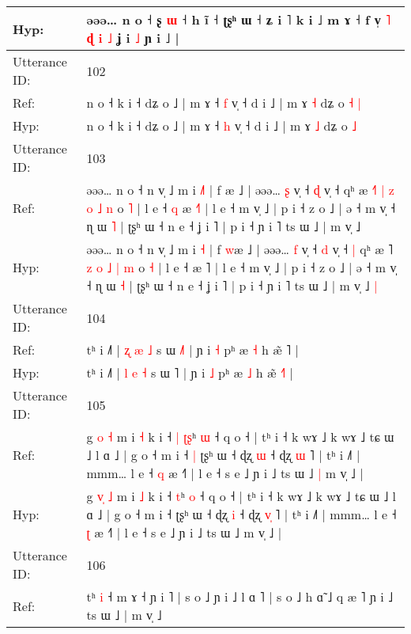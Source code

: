 \documentclass[10pt]{article}
\DeclareRobustCommand{\hl}[1]{{\textcolor{red}{#1}}}
\begin{document}
\begin{longtable}{ll}
 \\
Hyp: & əəə… n o ˧ ʂ \hl{ɯ} ˧ h ĩ ˧ ʈʂʰ ɯ ˧ ʑ i ˥ k i ˩\hl{}\hl{} m ɤ ˧ f v̩\hl{ }\hl{˥}\hl{ }\hl{ɖ}\hl{ }\hl{i} \hl{˩} ʝ i \hl{˩} ɲ i ˩ |
 \\
\midrule
Utterance ID: & 102 \\
Ref: & n o ˧ k i ˧ dʑ o ˩ | m ɤ ˧ \hl{f} v̩ ˧ d i ˩ | m ɤ \hl{˧} dʑ o\hl{ }\hl{˧} \hl{|}
 \\
Hyp: & n o ˧ k i ˧ dʑ o ˩ | m ɤ ˧ \hl{h} v̩ ˧ d i ˩ | m ɤ \hl{˩} dʑ o\hl{}\hl{} \hl{˩}
 \\
\midrule
Utterance ID: & 103 \\
Ref: & əəə… n o ˧ n v̩ ˩ m i \hl{˩}\hl{˥} | f \hl{}æ ˩ | əəə… \hl{ʂ} v̩ ˧ \hl{ɖ} v̩ ˧\hl{}\hl{} qʰ æ \hl{˧}˥ \hl{|} \hl{z} \hl{o} \hl{˩} \hl{n} o \hl{˥} | l e ˧\hl{ }\hl{q} æ \hl{˧}˥ | l e ˧ m v̩ ˩ | p i ˧ z o ˩ | ə ˧ m v̩ ˧ ɳ ɯ \hl{˥} | ʈʂʰ ɯ ˧ n e ˧ ʝ i ˥ | p i ˧ ɲ i ˥ ts ɯ ˩ | m v̩ ˩\hl{}\hl{}
 \\
Hyp: & əəə… n o ˧ n v̩ ˩ m i \hl{}\hl{˧} | f \hl{w}æ ˩ | əəə… \hl{f} v̩ ˧ \hl{d} v̩ ˧\hl{ }\hl{|} qʰ æ \hl{}˥ \hl{z} \hl{o} \hl{˩} \hl{|} \hl{m} o \hl{˧} | l e ˧\hl{}\hl{} æ \hl{}˥ | l e ˧ m v̩ ˩ | p i ˧ z o ˩ | ə ˧ m v̩ ˧ ɳ ɯ \hl{˧} | ʈʂʰ ɯ ˧ n e ˧ ʝ i ˥ | p i ˧ ɲ i ˥ ts ɯ ˩ | m v̩ ˩\hl{ }\hl{|}
 \\
\midrule
Utterance ID: & 104 \\
Ref: & tʰ i ˩˥ | \hl{ʐ} \hl{æ} \hl{˩} s ɯ \hl{˩}˥ | ɲ i \hl{˧} pʰ æ \hl{˧} h æ̃ \hl{}˥ |
 \\
Hyp: & tʰ i ˩˥ | \hl{l} \hl{e} \hl{˧} s ɯ \hl{}˥ | ɲ i \hl{˩} pʰ æ \hl{˩} h æ̃ \hl{˧}˥ |
 \\
\midrule
Utterance ID: & 105 \\
Ref: & g \hl{}\hl{o} \hl{˧} m i \hl{˧} k i ˧\hl{ }\hl{|} \hl{ʈ}\hl{ʂ}ʰ \hl{ɯ} ˧ q o ˧ | tʰ i ˧ k wɤ ˩ k wɤ ˩ tɕ ɯ ˩ l ɑ ˩ | g o ˧ m i ˧\hl{ }\hl{|} ʈʂʰ ɯ ˧ ɖʐ \hl{ɯ} ˧ ɖʐ \hl{}\hl{ɯ} ˥ | tʰ i ˩˥ | mmm… l e ˧ \hl{q} æ ˧˥ | l e ˧ s e ˩ ɲ i ˩ ts ɯ ˩\hl{ }\hl{|} m v̩ ˩ |
 \\
Hyp: & g \hl{v}\hl{̩} \hl{˩} m i \hl{˩} k i ˧\hl{}\hl{} \hl{}\hl{t}ʰ \hl{o} ˧ q o ˧ | tʰ i ˧ k wɤ ˩ k wɤ ˩ tɕ ɯ ˩ l ɑ ˩ | g o ˧ m i ˧\hl{}\hl{} ʈʂʰ ɯ ˧ ɖʐ \hl{i} ˧ ɖʐ \hl{v}\hl{̩} ˥ | tʰ i ˩˥ | mmm… l e ˧ \hl{ʈ} æ ˧˥ | l e ˧ s e ˩ ɲ i ˩ ts ɯ ˩\hl{}\hl{} m v̩ ˩ |
 \\
\midrule
Utterance ID: & 106 \\
Ref: & tʰ \hl{}\hl{i} ˧ m ɤ ˧ ɲ i ˥ | s o ˩ ɲ i ˩ l ɑ ˥ |\hl{}\hl{}\hl{}\hl{} s o ˩\hl{}\hl{} h ɑ̃ ˩ q æ ˥ ɲ i ˩ ts ɯ ˩ | m v̩ ˩\hl{}\hl{}
 \\

\end{longtable}
\end{document}
